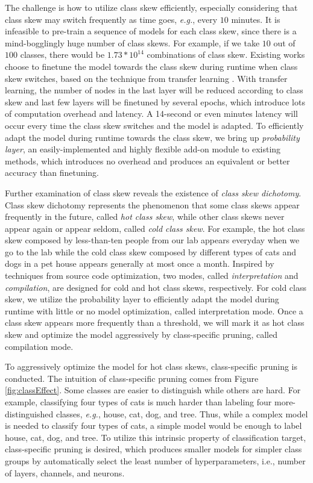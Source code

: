 \documentclass[pageno]{jpaper}
\begin{document}
The challenge is how to utilize class skew efficiently, especially considering that class skew may switch frequently as time goes, \textit{e.g.}, every $10$ minutes. It is infeasible to pre-train a sequence of models for each class skew, since there is a mind-bogglingly huge number of class skews. For example, if we take $10$ out of $100$ classes, there would be $1.73 \ast 10^{14}$ combinations of class skew. Existing works \cite{han2016mcdnn, shen2016fast} choose to finetune the model towards the class skew during runtime when class skew switches, based on the technique from transfer learning  \cite{doersch2015unsupervised, noroozi2016unsupervised, oquab2014learning, yosinski2014transferable}. With transfer learning, the number of nodes in the last layer will be reduced according to class skew and last few layers will be finetuned by several epochs, which introduce lots of computation overhead and latency. A 14-second or even minutes latency \cite{shen2016fast} will occur every time the class skew switches and the model is adapted. To efficiently adapt the model during runtime towards the class skew, we bring up \textit{probability layer}, an easily-implemented and highly flexible add-on module to existing methods, which introduces no overhead and produces an equivalent or better accuracy than finetuning.

Further examination of class skew reveals the existence of \textit{class skew dichotomy}. Class skew dichotomy represents the phenomenon that some class skews appear frequently in the future, called \textit{hot class skew}, while other class skews never appear again or appear seldom, called \textit{cold class skew}. For example, the hot class skew composed by less-than-ten people from our lab appears everyday when we go to the lab while the cold class skew composed by different types of cats and dogs in a pet house appears generally at most once a month. Inspired by techniques from source code optimization, two modes, called \textit{interpretation} and \textit{compilation}, are designed for cold and hot class skews, respectively. For cold class skew, we utilize the probability layer to efficiently adapt the model during runtime with little or no model optimization, called interpretation mode. Once a class skew appears more frequently than a threshold, we will mark it as hot class skew and optimize the model aggressively by class-specific pruning, called compilation mode. 


To aggressively optimize the model for hot class skews, class-specific pruning is conducted. The intuition of class-specific pruning comes from Figure \ref{fig:classEffect}. Some classes are easier to distinguish while others are hard. For example, classifying four types of cats is much harder than labeling four more-distinguished classes, \textit{e.g.}, house, cat, dog, and tree. Thus, while a complex model is needed to classify four types of cats, a simple model would be enough to label house, cat, dog, and tree. To utilize this intrinsic property of classification target, class-specific pruning is desired, which produces smaller models for simpler class groups by automatically select the least number of hyperparameters, i.e., number of layers, channels, and neurons. 
\end{document}

